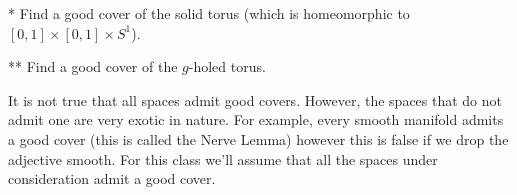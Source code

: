 \begin{ques}*
	Find a good cover of the solid torus (which is homeomorphic to $[0,1] \times [0,1] \times S^1$).
\end{ques}

\begin{ques}**
	Find a good cover of the $g$-holed torus.
\end{ques}
It is not true that all spaces admit good covers. However, the spaces that do not admit one are very exotic in nature. For example, every smooth manifold admits a good cover (this is called the Nerve Lemma) however this is false if we drop the adjective smooth. For this class we'll assume that all the spaces under consideration admit a good cover.
